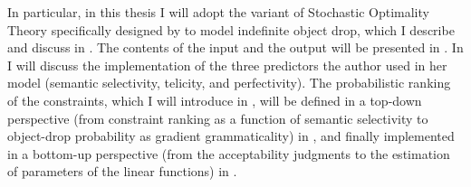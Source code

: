In particular, in this thesis I will adopt the variant of Stochastic Optimality Theory specifically designed by \textcite{Medina2007} to model indefinite object drop, which I describe and discuss in . The contents of the input and the output will be presented in . In  I will discuss the implementation of the three predictors the author used in her model (semantic selectivity, telicity, and perfectivity). The probabilistic ranking of the constraints, which I will introduce in , will be defined in a top-down perspective (from constraint ranking as a function of semantic selectivity to object-drop probability as gradient grammaticality) in , and finally implemented in a bottom-up perspective (from the acceptability judgments to the estimation of parameters of the linear functions) in .

